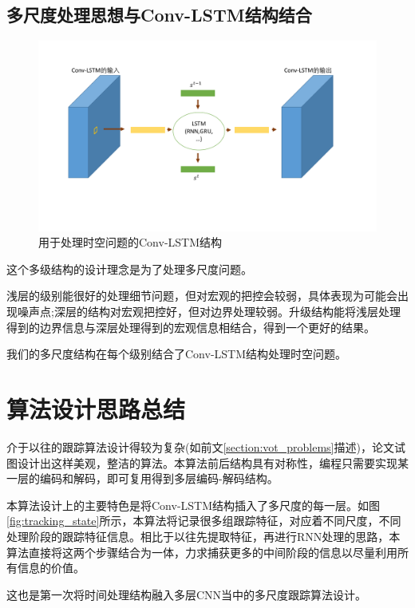 \subsection{多尺度处理思想与Conv-LSTM结构结合} \label{section:multiscale}
\par
\begin{figure}[htbp!]
    \centering
    \includegraphics[width = 1.\textwidth]{chap/img/crnn.pdf}
    \caption{用于处理时空问题的Conv-LSTM结构}
    \label{fig:conv_lstm_arch}
\end{figure}
\par
这个多级结构的设计理念是为了处理多尺度问题。
\par
浅层的级别能很好的处理细节问题，但对宏观的把控会较弱，具体表现为可能会出现噪声点;深层的结构对宏观把控好，但对边界处理较弱。升级结构能将浅层处理得到的边界信息与深层处理得到的宏观信息相结合，得到一个更好的结果。
\par
我们的多尺度结构在每个级别结合了Conv-LSTM结构处理时空问题。

\section{算法设计思路总结}
介于以往的跟踪算法设计得较为复杂(如前文\ref{section:vot_problems}描述)，论文试图设计出这样美观，整洁的算法。本算法前后结构具有对称性，编程只需要实现某一层的编码和解码，即可复用得到多层编码-解码结构。
\par
本算法设计上的主要特色是将Conv-LSTM结构插入了多尺度的每一层。如图\ref{fig:tracking_state}所示，本算法将记录很多组跟踪特征，对应着不同尺度，不同处理阶段的跟踪特征信息。相比于以往先提取特征，再进行RNN处理的思路，本算法直接将这两个步骤结合为一体，力求捕获更多的中间阶段的信息以尽量利用所有信息的价值。
\par
这也是第一次将时间处理结构融入多层CNN当中的多尺度跟踪算法设计。

